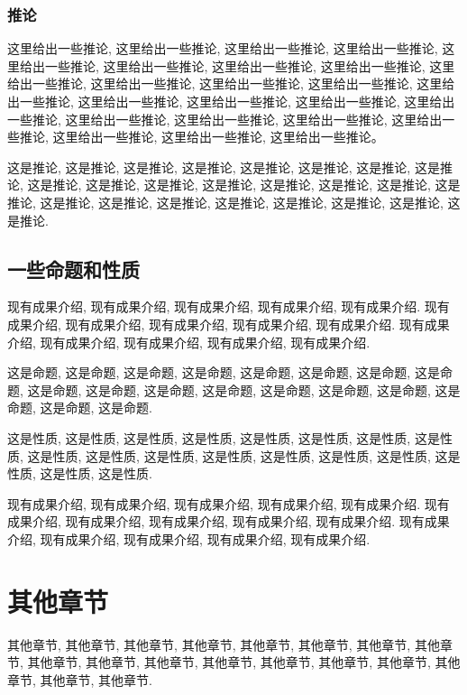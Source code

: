 \documentclass{ecnumaster}
\begin{document}
\subsection{推论}
这里给出一些推论, 这里给出一些推论, 这里给出一些推论,
这里给出一些推论, 这里给出一些推论, 这里给出一些推论,
这里给出一些推论, 这里给出一些推论, 这里给出一些推论,
这里给出一些推论, 这里给出一些推论, 这里给出一些推论,
这里给出一些推论, 这里给出一些推论, 这里给出一些推论,
这里给出一些推论, 这里给出一些推论, 这里给出一些推论,
这里给出一些推论, 这里给出一些推论, 这里给出一些推论,
这里给出一些推论, 这里给出一些推论, 这里给出一些推论。

\begin{corollary}
  这是推论, 这是推论, 这是推论, 这是推论, 这是推论, 这是推论,
  这是推论, 这是推论, 这是推论, 这是推论, 这是推论, 这是推论,
  这是推论, 这是推论, 这是推论, 这是推论, 这是推论, 这是推论,
  这是推论, 这是推论, 这是推论, 这是推论, 这是推论, 这是推论.
\end{corollary}

\section{一些命题和性质}
现有成果介绍, 现有成果介绍, 现有成果介绍, 现有成果介绍, 现有成果介绍.
现有成果介绍, 现有成果介绍, 现有成果介绍, 现有成果介绍, 现有成果介绍.
现有成果介绍, 现有成果介绍, 现有成果介绍, 现有成果介绍, 现有成果介绍.

\begin{proposition}
  这是命题, 这是命题, 这是命题, 这是命题, 这是命题, 这是命题,
  这是命题, 这是命题, 这是命题, 这是命题, 这是命题, 这是命题,
  这是命题, 这是命题, 这是命题, 这是命题, 这是命题, 这是命题.
\end{proposition}

\begin{property}
  这是性质, 这是性质, 这是性质, 这是性质, 这是性质, 这是性质,
  这是性质, 这是性质, 这是性质, 这是性质, 这是性质, 这是性质,
  这是性质, 这是性质, 这是性质, 这是性质, 这是性质, 这是性质.
\end{property}

现有成果介绍, 现有成果介绍, 现有成果介绍, 现有成果介绍, 现有成果介绍.
现有成果介绍, 现有成果介绍, 现有成果介绍, 现有成果介绍, 现有成果介绍.
现有成果介绍, 现有成果介绍, 现有成果介绍, 现有成果介绍, 现有成果介绍.


\clearpage{\pagestyle{empty}\cleardoublepage}
\chapter{其他章节}
其他章节, 其他章节, 其他章节, 其他章节, 其他章节, 其他章节,
其他章节, 其他章节, 其他章节, 其他章节, 其他章节, 其他章节,
其他章节, 其他章节, 其他章节, 其他章节, 其他章节, 其他章节.
\end{document}
